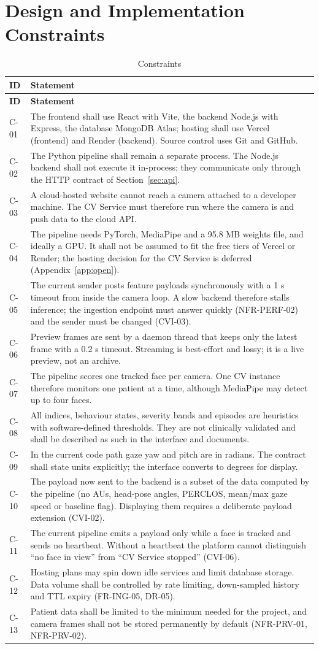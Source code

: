 \documentclass[a4paper,11pt]{scrreprt}
\makeatletter
\newenvironment{idtable}[1]{%
  \small
  \begin{longtable}{@{}>{\ttfamily\footnotesize}p{1.9cm}>{\raggedright\arraybackslash}p{13.2cm}@{}}
  \caption{#1}\\
  \toprule \textbf{ID} & \textbf{Statement}\\ \midrule
  \endfirsthead
  \toprule \textbf{ID} & \textbf{Statement}\\ \midrule
  \endhead
  \bottomrule
  \endfoot
}{%
  \end{longtable}\normalsize
}
\newcommand{\idr}[2]{#1 & #2 \\ \midrule}
\makeatother
\begin{document}
\section{Design and Implementation Constraints}\label{sec:constraints}
\begin{idtable}{Constraints}
\idr{C-01}{The frontend shall use React with Vite, the backend Node.js with Express, the database MongoDB Atlas; hosting shall use Vercel (frontend) and Render (backend). Source control uses Git and GitHub.}
\idr{C-02}{The Python pipeline shall remain a separate process. The Node.js backend shall not execute it in-process; they communicate only through the HTTP contract of Section~\ref{sec:api}.}
\idr{C-03}{A cloud-hosted website cannot reach a camera attached to a developer machine. The CV Service must therefore run where the camera is and push data to the cloud API.}
\idr{C-04}{The pipeline needs PyTorch, MediaPipe and a 95.8 MB weights file, and ideally a GPU. It shall not be assumed to fit the free tiers of Vercel or Render; the hosting decision for the CV Service is deferred (Appendix~\ref{app:open}).}
\idr{C-05}{The current sender posts feature payloads synchronously with a 1 s timeout from inside the camera loop. A slow backend therefore stalls inference; the ingestion endpoint must answer quickly (NFR-PERF-02) and the sender must be changed (CVI-03).}
\idr{C-06}{Preview frames are sent by a daemon thread that keeps only the latest frame with a 0.2 s timeout. Streaming is best-effort and lossy; it is a live preview, not an archive.}
\idr{C-07}{The pipeline scores one tracked face per camera. One CV instance therefore monitors one patient at a time, although MediaPipe may detect up to four faces.}
\idr{C-08}{All indices, behaviour states, severity bands and episodes are heuristics with software-defined thresholds. They are not clinically validated and shall be described as such in the interface and documents.}
\idr{C-09}{In the current code path gaze yaw and pitch are in radians. The contract shall state units explicitly; the interface converts to degrees for display.}
\idr{C-10}{The payload now sent to the backend is a subset of the data computed by the pipeline (no AUs, head-pose angles, PERCLOS, mean/max gaze speed or baseline flag). Displaying them requires a deliberate payload extension (CVI-02).}
\idr{C-11}{The current pipeline emits a payload only while a face is tracked and sends no heartbeat. Without a heartbeat the platform cannot distinguish ``no face in view'' from ``CV Service stopped'' (CVI-06).}
\idr{C-12}{Hosting plans may spin down idle services and limit database storage. Data volume shall be controlled by rate limiting, down-sampled history and TTL expiry (FR-ING-05, DR-05).}
\idr{C-13}{Patient data shall be limited to the minimum needed for the project, and camera frames shall not be stored permanently by default (NFR-PRV-01, NFR-PRV-02).}
\end{idtable}
\end{document}
